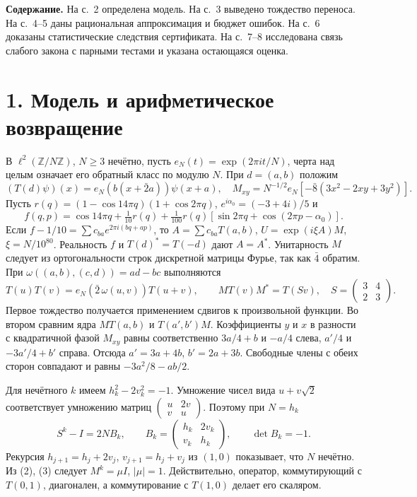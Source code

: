 \documentclass[11pt,a4paper]{article}
\newcommand{\Z}{\mathbb Z}
\newcommand{\sect}[1]{\section*{\sffamily\color{ink}#1}}
\newcommand{\subt}[1]{\par\medskip\noindent\textbf{#1.}\quad}
\begin{document}
\subt{Содержание} На с.~2 определена модель. На с.~3 выведено тождество переноса. На с.~4--5 даны рациональная аппроксимация и бюджет ошибок. На с.~6 доказаны статистические следствия сертификата. На с.~7--8 исследована связь слабого закона с парными тестами и указана остающаяся оценка.
\newpage
\sect{1. Модель и арифметическое возвращение}
В $\ell^2(\Z/N\Z)$, $N\ge3$ нечётно, пусть $e_N(t)=\exp(2\pi i t/N)$, черта над целым означает его обратный класс по модулю $N$. При $d=(a,b)$ положим
\[
 (T(d)\psi)(x)=e_N(b(x+\bar2a))\psi(x+a),\quad
 M_{xy}=N^{-1/2}e_N[-\bar8(3x^2-2xy+3y^2)] .
\]
Пусть $r(q)=(1-\cos14\pi q)(1+\cos2\pi q)$, $e^{i\alpha_0}=(-3+4i)/5$ и
\[
 f(q,p)=\cos14\pi q+\tfrac1{10}r(q)+\tfrac1{100}r(q)
    [\sin2\pi q+\cos(2\pi p-\alpha_0)] .
\]
Если $f-1/10=\sum c_{ba}e^{2\pi i(bq+ap)}$, то $A=\sum c_{ba}T(a,b)$,
$U=\exp(i\xi A)M$, $\xi=N/10^{80}$. Реальность $f$ и $T(d)^*=T(-d)$ дают $A=A^*$. Унитарность $M$ следует из ортогональности строк дискретной матрицы Фурье, так как $\bar4$ обратим.
При $\omega((a,b),(c,d))=ad-bc$ выполняются
\[
 T(u)T(v)=e_N(\bar2\,\omega(u,v))T(u+v),\qquad
 M T(v) M^*=T(Sv),\quad S=\begin{pmatrix}3&4\\2&3\end{pmatrix}.       \tag{2}
\]
Первое тождество получается применением сдвигов к произвольной функции. Во втором сравним ядра $MT(a,b)$ и $T(a',b')M$. Коэффициенты $y$ и $x$ в разности с квадратичной фазой $M_{xy}$ равны соответственно $3a/4+b$ и $-a/4$ слева, $a'/4$ и $-3a'/4+b'$ справа. Отсюда $a'=3a+4b$, $b'=2a+3b$. Свободные члены с обеих сторон совпадают и равны $-3a^2/8-ab/2$.

Для нечётного $k$ имеем $h_k^2-2v_k^2=-1$. Умножение чисел вида $u+v\sqrt2$ соответствует умножению матриц $\left(\begin{smallmatrix}u&2v\\v&u\end{smallmatrix}\right)$. Поэтому при $N=h_k$
\[
 S^k-I=2N B_k,\qquad
 B_k=\begin{pmatrix}h_k&2v_k\\ v_k&h_k\end{pmatrix},\qquad \det B_k=-1. \tag{3}
\]
Рекурсия $h_{j+1}=h_j+2v_j$, $v_{j+1}=h_j+v_j$ из $(1,0)$ показывает, что $N$ нечётно. Из (2), (3) следует $M^k=\mu I$, $|\mu|=1$. Действительно, оператор, коммутирующий с $T(0,1)$, диагонален, а коммутирование с $T(1,0)$ делает его скаляром.
\end{document}
